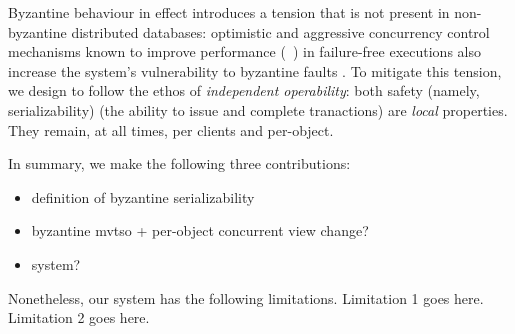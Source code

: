 Byzantine behaviour in effect introduces a tension that is not present in non-byzantine
distributed databases: optimistic and aggressive concurrency control mechanisms known
to improve performance (~\cite{occ,mvtso,pipeline,tapir}) in failure-free executions also increase the system's vulnerability to byzantine faults . To mitigate this tension, we design \sys{} to follow the ethos of \textit{independent operability}: both safety (namely, serializability) (the ability to issue and complete tranactions)
are \textit{local} properties. They remain, at all times, per clients and per-object.
 

In summary, we make the following three contributions: 
\begin{itemize}
\item definition of byzantine serializability
\item  byzantine mvtso + per-object concurrent view change?
\item system?
\end{itemize}

Nonetheless, our system has the following limitations. Limitation 1 goes here. Limitation 2 goes here.

\iffalse
The rest of the paper is structured as follows. Section~\sec{sec:model} formalises \sys{}'s correctness guarantees.
Section~\sec{sec:}. Finally, we summarise related work (\S\sec{sec:rel}) and conclude (\S\sec{sec:conc}).
\fi
